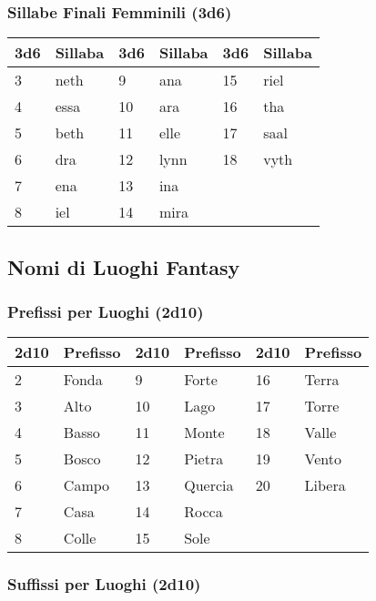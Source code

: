 \begin{multicols}{2}
{\subsubsection*{Sillabe Finali Femminili (3d6)}
\noindent\begin{tabularx}{\linewidth}{X|l|X|l|X|l}
	\toprule
\rowcolor{gray!20}\textbf{3d6} & \textbf{Sillaba} & \textbf{3d6} & \textbf{Sillaba} & \textbf{3d6} & \textbf{Sillaba} \\
\toprule
3 & neth & 9 & ana & 15 & riel \\
\rowcolor{gray!20}4 & essa & 10 & ara & 16 & tha \\
5 & beth & 11 & elle & 17 & saal \\
\rowcolor{gray!20}6 & dra & 12 & lynn & 18 & vyth \\
7 & ena & 13 & ina & & \\
\rowcolor{gray!20}8 & iel & 14 & mira & & \\
\end{tabularx}


\subsection*{Nomi di Luoghi Fantasy}

\subsubsection*{Prefissi per Luoghi (2d10)}
\noindent\begin{tabularx}{\linewidth}{X|l|X|l|X|l}
	\toprule
 \rowcolor{gray!20}\textbf{2d10} & \textbf{Prefisso} & \textbf{2d10} & \textbf{Prefisso} & \textbf{2d10} & \textbf{Prefisso} \\
\toprule
	2 & Fonda & 9 & Forte & 16 & Terra \\
 \rowcolor{gray!20}3 & Alto & 10 & Lago & 17 & Torre \\
	4 & Basso & 11 & Monte & 18 & Valle \\
 \rowcolor{gray!20}5 & Bosco & 12 & Pietra & 19 & Vento \\
	6 & Campo & 13 & Quercia & 20 & Libera \\
 \rowcolor{gray!20}7 & Casa & 14 & Rocca & & \\
	8 & Colle & 15 & Sole & & \\
\end{tabularx}

\subsubsection*{Suffissi per Luoghi (2d10)}

}
\end{multicols}
